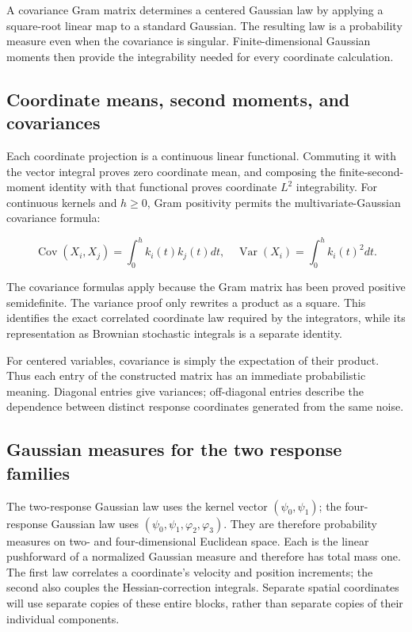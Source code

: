 \documentclass[11pt,a4paper]{report}
\begin{document}
A covariance Gram matrix determines a centered Gaussian law by applying a square-root linear map to a standard Gaussian. The resulting law is a probability measure even when the covariance is singular. Finite-dimensional Gaussian moments then provide the integrability needed for every coordinate calculation.

\subsection{\texorpdfstring{Coordinate means, second moments, and covariances}{Coordinate means, second moments, and covariances}}
\label{report-step-KineticLangevin-Gaussian-lean-2}


Each coordinate projection is a continuous linear functional. Commuting it with the vector integral proves zero coordinate mean, and composing the finite-second-moment identity with that functional proves coordinate \(L^{2}\) integrability. For continuous kernels and \(h\ge0\), Gram positivity permits the multivariate-Gaussian covariance formula:

\[\operatorname{Cov}(X_i,X_j)=\int_0^hk_i(t)k_j(t)dt,\quad
\operatorname{Var}(X_i)=\int_0^hk_i(t)^2dt.\]

The covariance formulas apply because the Gram matrix has been proved positive semidefinite. The variance proof only rewrites a product as a square. This identifies the exact correlated coordinate law required by the integrators, while its representation as Brownian stochastic integrals is a separate identity.



For centered variables, covariance is simply the expectation of their product. Thus each entry of the constructed matrix has an immediate probabilistic meaning. Diagonal entries give variances; off-diagonal entries describe the dependence between distinct response coordinates generated from the same noise.

\subsection{\texorpdfstring{Gaussian measures for the two response families}{Gaussian measures for the two response families}}
\label{report-step-KineticLangevin-Gaussian-lean-3}


The two-response Gaussian law uses the kernel vector \((\psi_0,\psi_1)\); the four-response Gaussian law uses \((\psi_0,\psi_1,\varphi_2,\varphi_3)\). They are therefore probability measures on two- and four-dimensional Euclidean space. Each is the linear pushforward of a normalized Gaussian measure and therefore has total mass one. The first law correlates a coordinate's velocity and position increments; the second also couples the Hessian-correction integrals. Separate spatial coordinates will use separate copies of these entire blocks, rather than separate copies of their individual components.
\end{document}
